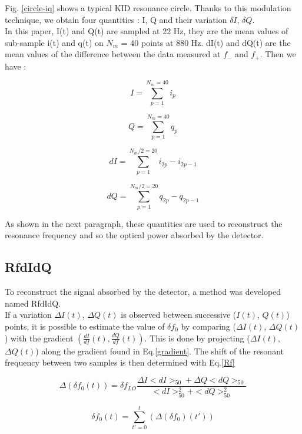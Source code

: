 Fig. \ref{circle-iq} shows a typical KID resonance circle. Thanks to this modulation technique, we obtain four quantities : I, Q and their variation $\delta I$, $\delta Q$.\\
In this paper, I(t) and Q(t) are sampled at 22 Hz, they are the mean values of sub-sample i(t) and q(t) on $N_{m}$ = 40 points at 880 Hz. dI(t) and dQ(t) are the mean values of the difference between the data measured at $f_{-}$ and $f_{+}$. Then we have :

\begin{equation}
I = \sum^{N_{m}=40}_{p=1} i_{p}
\end{equation}

\begin{equation}
Q = \sum^{N_{m}=40}_{p=1} q_{p}
\end{equation}

\begin{equation}
dI = \sum^{N_{m}/2=20}_{p=1} i_{2p} - i_{2p-1}
\end{equation}

\begin{equation}
dQ = \sum^{N_{m}/2=20}_{p=1} q_{2p} - q_{2p-1}
\end{equation}

As shown in the next paragraph, these quantities are used to reconstruct the resonance frequency and so the optical power absorbed by the detector.

\subsection{RfdIdQ}
To reconstruct the signal absorbed by the detector, a method was developed named RfdIdQ.\\
If a variation $\Delta I(t)$, $\Delta Q(t)$ is observed between successive  ($I(t)$, $Q(t)$) points, it is possible to estimate the value of $\delta f_{0}$ by comparing ($\Delta I(t)$, $\Delta Q(t)$) with the gradient $(\frac{dI}{df}(t),\frac{dQ}{df}(t)) $. This is done by projecting ($\Delta I(t)$, $\Delta Q(t)$) along the gradient found in Eq.\ref{gradient}. The shift of the resonant frequency between two samples is then determined with Eq.\ref{Rf} \citep{2014A&A...569A...9C}

\begin{equation}
\label{Rf}
\Delta (\delta f_{0}(t)) = \delta f_{LO} \frac{\Delta I<dI>_{50} + \Delta Q<dQ>_{50} }{<dI>_{50}^{2} + <dQ>_{50}^{2}}
\end{equation}

\begin{equation}
\delta f_{0}(t) = \sum^{t}_{t'=0} (\Delta (\delta f_{0})(t'))
\end{equation}

